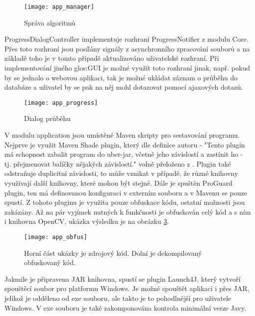 \begin{figure}[h]
	\texttt{[image: app\_manager]}
	\centering
	\caption{Správa algoritmů \label{fig:app_manager}}
\end{figure} 
\FloatBarrier

ProgressDialogController implementuje rozhraní ProgressNotifier z modulu Core. Přes toto rozhraní jsou posílány signály z asynchronního zpracování souborů a na základě toho je v tomto případě aktualizováno uživatelské rozhraní. Při implementování jiného \gls{glos:GUI} je možné využít toto rozhraní jinak, např. pokud by se jednalo o webovou aplikaci, tak je možné ukládat záznam o průběhu do databáze a uživatel by se pak na něj mohl dotazovat pomocí ajaxových dotazů.

\begin{figure}[h]
	\texttt{[image: app\_progress]}
	\centering
	\caption{Dialog průběhu \label{fig:app_progress}}
\end{figure} 
\FloatBarrier

V modulu application jsou umístěné Maven skripty pro sestavování programu. Nejprve je využit Maven Shade plugin, který dle definice autoru - "Tento plugin má schopnost zabalit program do uber-jar, včetně jeho závislostí a zastínit ho - tj. přejmenovat balíčky nějakých závislostí." volně přeloženo z \cite{apache}. Plugin také odstraňuje duplicitní závislosti, to může vznikat v případě, že různé knihovny využívají další knihovny, které mohou být stejné. Dále je spuštěn ProGuard plugin, ten má definovanou konfiguraci v externím souboru a v Mavenu se pouze spustí. Z tohoto pluginu je využita pouze obfuskace kódu, ostatní možnosti jsou zakázány. Až na pár vyjímek nutných k funkčnosti je obfuskován celý kód a s ním i knihovna OpenCV, ukázka výsledku je na obrázku \ref{fig:app_obfus}.

\begin{figure}[h]
	\texttt{[image: app\_obfus]}
	\centering
	\caption{Horní část ukázky je zdrojový kód. Dolní je dekompilovaný obfuskovaný kód. \label{fig:app_obfus}}
\end{figure} 
\FloatBarrier

Jakmile je připravena JAR knihovna, spustí se plugin Launch4J, který vytvoří spouštěcí soubor pro platformu Windows. Je možné spouštět aplikaci i přes JAR, jelikož je odděleno od exe souboru, ale takto je to pohodlnější pro uživatele Windows. V exe souboru je také zakomponována kontrola minimální verze Javy.


